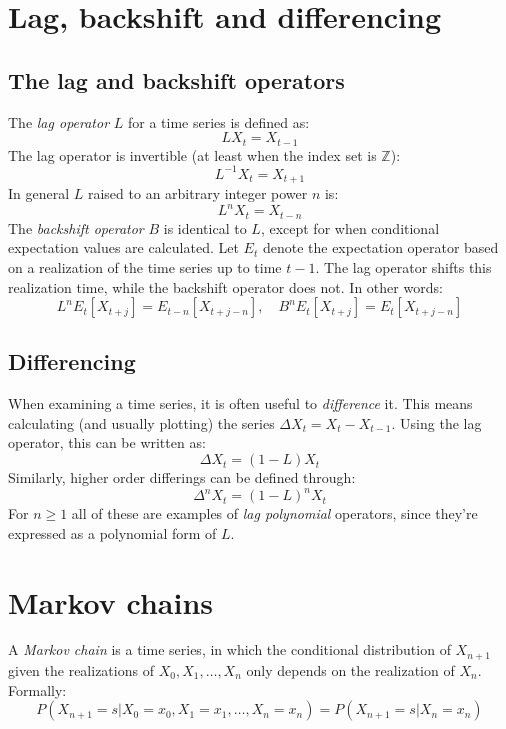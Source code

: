 \documentclass[12pt, a4paper]{article}
\numberwithin{equation}{section}
\begin{document}
\section{Lag, backshift and differencing}

\subsection{The lag and backshift operators}
The \textit{lag operator} $L$ for a time series is defined as:
\begin{equation}
LX_t=X_{t-1}
\end{equation}
The lag operator is invertible (at least when the index set is $\mathbb{Z}$):
\begin{equation}
L^{-1}X_t=X_{t+1}
\end{equation}
In general $L$ raised to an arbitrary integer power $n$ is:
\begin{equation}
L^n X_t=X_{t-n}
\end{equation}
The \textit{backshift operator} $B$ is identical to $L$, except for when conditional expectation values are calculated. Let $E_t$ denote the expectation operator based on a realization of the time series up to time $t-1$. The lag operator shifts this realization time, while the backshift operator does not. In other words:
\begin{equation}
L^n E_t[X_{t+j}]=E_{t-n}[X_{t+j-n}],\quad B^n E_t[X_{t+j}]=E_t[X_{t+j-n}]
\end{equation}

\subsection{Differencing}
When examining a time series, it is often useful to \textit{difference} it. This means calculating (and usually plotting) the series $\Delta X_t=X_t-X_{t-1}$. Using the lag operator, this can be written as:
\begin{equation}
\Delta X_t=(1-L)X_t
\end{equation}
Similarly, higher order differings can be defined through:
\begin{equation}
\Delta^n X_t=(1-L)^n X_t
\end{equation}
For $n\ge 1$ all of these are examples of \textit{lag polynomial} operators, since they're expressed as a polynomial form of $L$.

\section{Markov chains}
A \textit{Markov chain} is a time series, in which the conditional distribution of $X_{n+1}$ given the realizations of $X_0, X_1,\ldots, X_n$ only depends on the realization of $X_n$. Formally:
\begin{equation}
P(X_{n+1}=s|X_0=x_0, X_1=x_1,\ldots, X_n=x_n)=P(X_{n+1}=s|X_n=x_n)
\end{equation}
\end{document}
